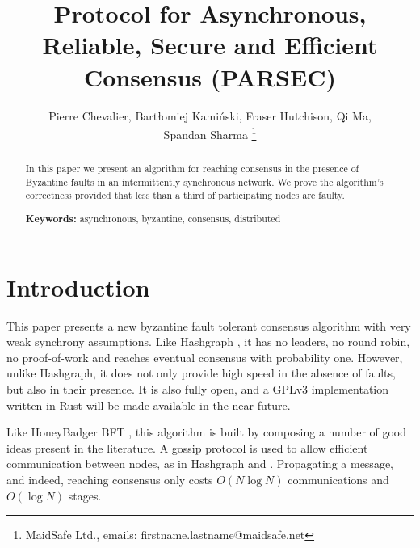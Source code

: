 \documentclass[a4paper,fleqn]{article}
\begin{document}

\renewcommand{\topfraction}{0.85}
\renewcommand{\textfraction}{0.1}
\renewcommand{\floatpagefraction}{0.75}
\setlength\parindent{0.5cm}
\setcounter{tocdepth}{3}

\theoremstyle{definition}
\newtheorem{defn}{Definition}[section]
\theoremstyle{plain}
\newtheorem{thm}{Theorem}[section]
\newtheorem{lem}[thm]{Lemma}

\title{Protocol for Asynchronous, Reliable, Secure and Efficient Consensus (PARSEC)}

\author{Pierre Chevalier, Bartłomiej Kamiński, Fraser Hutchison, Qi Ma, \\
Spandan Sharma
\thanks{MaidSafe Ltd., emails: firstname.lastname@maidsafe.net}}%

\maketitle


\begin{abstract}
	In this paper we present an algorithm for reaching consensus in the presence of Byzantine
	faults in an intermittently synchronous network. We prove the algorithm's correctness provided
	that less than a third of participating nodes are faulty.

	\textbf{Keywords:} asynchronous, byzantine, consensus, distributed
\end{abstract}


\section{Introduction}

This paper presents a new byzantine fault tolerant consensus algorithm with very weak synchrony
assumptions. Like Hashgraph \cite{hg}, it has no leaders, no round robin, no proof-of-work and
reaches eventual consensus with probability one. However, unlike Hashgraph, it does not only
provide high speed in the absence of faults, but also in their presence. It is also fully open, and
a GPLv3 implementation written in Rust will be made available in the near future.

Like HoneyBadger BFT \cite{hbbft}, this algorithm is built by composing a number of good ideas
present in the literature. A gossip protocol is used to allow efficient communication between
nodes, as in Hashgraph and \cite{snowflake}.  Propagating a message, and indeed, reaching consensus
only costs $O(N\log{N})$ communications and $O(\log{N})$ stages.
\end{document}
